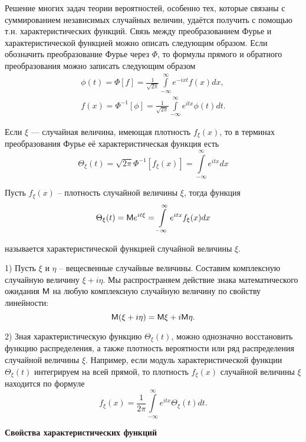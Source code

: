 
\begin{zam}
Решение многих задач теории вероятностей, особенно тех, которые связаны с суммированием независимых случайных величин, удаётся получить с помощью т.н. характеристических функций.
Связь между преобразованием Фурье и характеристической функцией можно описать следующим образом. Если обозначить преобразование Фурье через $\Phi$, то формулы прямого и обратного преобразования можно записать
следующим образом
\begin{gather*}
	\phi(t) = \Phi[f] = \frac{1}{\sqrt{2\pi}}\int\limits_{-\infty}^{\infty}e^{-ixt}f(x)dx, \\
	f(x) = \Phi^{-1}[\phi] = \frac{1}{\sqrt{2\pi}} \int\limits_{-\infty}^{\infty}e^{itx}\phi(t)dt.   
\end{gather*}

Если $\xi$ — случайная величина, имеющая плотность $f_{\xi}(x)$, то в терминах преобразования Фурье её характеристическая функция есть
$$\Theta_{\xi} (t) = \sqrt{2\pi}\Phi^{-1}[f_{\xi}(x)] = \int\limits_{-\infty}^{\infty}e^{itx}dx$$
\end{zam}

\begin{definition}
	Пусть $f_{\xi}(x)$ -- плотность случайной величины $\xi$,
тогда функция
$$\Theta_{\xi}(t) = \mathsf{M} e^{it\xi} = \int\limits_{-\infty}^{\infty} e^{itx}f_{\xi}(x)dx$$

называется характеристической функцией случайной величины $\xi$.
\end{definition}

\begin{zam}
1) Пусть $\xi$ и $\eta$ -- вещесвенные случайные величины. Составим комплексную случайную величину $\xi + i\eta$. Мы распространяем действие знака математического ожидания $\mathsf{M}$ на любую комплексную случайную величину по свойству линейности:
$$\mathsf{M}(\xi + i\eta) = \mathsf{M}\xi + i \mathsf{M}\eta.$$

2) Зная характеристическую функцию $\Theta_{\xi} (t)$, можно однозначно восстановить функцию распределения, а также плотность вероятности или ряд распределения случайной величины $\xi$. Например, если модуль характеристической функции $\Theta_{\xi} (t)$ интегрируем на всей прямой, то плотность $f_{\xi}(x)$
случайной величины $\xi$ находится по формуле
$$f_{\xi}(x) =\frac{1}{2\pi}\int\limits_{-\infty}^{\infty}e^{itx}\Theta_{\xi} (t) dt.$$
\end{zam}

\textbf{Свойства характеристических функций}

